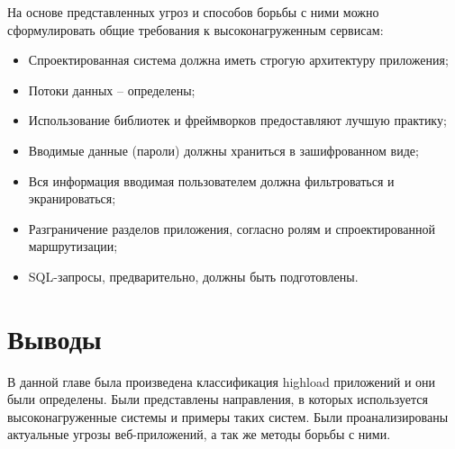 На основе представленных угроз и способов борьбы с ними можно сформулировать общие требования к высоконагруженным сервисам:
\begin{itemize}
	\item Спроектированная система должна иметь строгую архитектуру приложения;
	\item Потоки данных – определены;
	\item Использование библиотек и фреймворков предоставляют лучшую практику;
	\item Вводимые данные (пароли) должны храниться в зашифрованном виде;
	\item Вся информация вводимая пользователем должна фильтроваться и экранироваться;
	\item Разграничение разделов приложения, согласно ролям и спроектированной маршрутизации;
	\item SQL-запросы, предварительно, должны быть подготовлены.
\end{itemize}

\section{Выводы} \label{ch1:conclusion}

В данной главе была произведена классификация highload приложений и они были определены. Были представлены направления, в которых используется высоконагруженные системы и примеры таких систем. Были проанализированы актуальные угрозы веб-приложений, а так же методы борьбы с ними.
